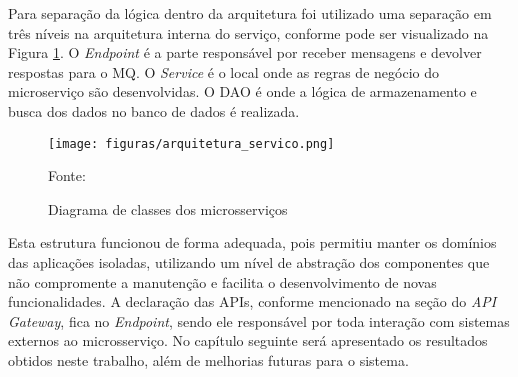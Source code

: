 Para separação da lógica dentro da arquitetura foi utilizado uma separação
em três níveis na arquitetura interna do serviço, conforme pode ser visualizado
na Figura \ref{fig:arch-servico}. O \emph{Endpoint} é a parte responsável
por receber mensagens e devolver respostas para o \ac{MQ}. O \emph{Service}
é o local onde as regras de negócio do microserviço são desenvolvidas. O
\ac{DAO} é onde a lógica de armazenamento e busca dos dados no banco de
dados é realizada.

\begin{figure}[H]
	\centering
	\caption{Diagrama de classes dos microsserviços}
	\texttt{[image: figuras/arquitetura\_servico.png]}

	\label{fig:arch-servico}
	\footnotesize Fonte: \fonteOAutor
\end{figure}

Esta estrutura funcionou de forma adequada, pois permitiu manter os domínios
das aplicações isoladas, utilizando um nível de abstração dos componentes
que não compromente a manutenção e facilita o desenvolvimento de novas
funcionalidades. A declaração das \acp{API}, conforme mencionado na seção
do \emph{API Gateway}, fica no \emph{Endpoint}, sendo ele responsável
por toda interação com sistemas externos ao microsserviço. No capítulo
seguinte será apresentado os resultados obtidos neste trabalho, além de
melhorias futuras para o sistema.
